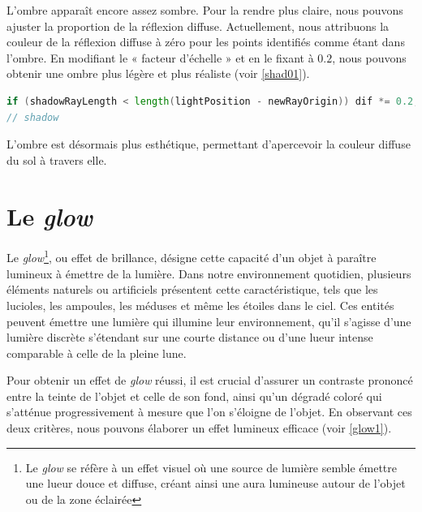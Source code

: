 L'ombre apparaît encore assez sombre. Pour la rendre plus claire, nous pouvons ajuster la proportion de la réflexion diffuse. Actuellement, nous attribuons la couleur de la réflexion diffuse à zéro pour les points identifiés comme étant dans l'ombre. En modifiant le « facteur d'échelle » et en le fixant à $0.2$, nous pouvons obtenir une ombre plus légère et plus réaliste (voir \ref{shad01}).

\begin{minipage}{\linewidth}
\begin{lstlisting}[language=GLSL, caption=Ajuster la proportion de la réflexion diffuse,captionpos=b,frame=single]
if (shadowRayLength < length(lightPosition - newRayOrigin)) dif *= 0.2; 
// shadow
\end{lstlisting}
\end{minipage}

L'ombre est désormais plus esthétique, permettant d'apercevoir la couleur diffuse du sol à travers elle.

\newpage
\section{Le \textit{glow}}

Le \textit{glow}\footnote{Le \textit{glow} se réfère à un effet visuel où une source de lumière semble émettre une lueur douce et diffuse, créant ainsi une aura lumineuse autour de l'objet ou de la zone éclairée}, ou effet de brillance, désigne cette capacité d'un objet à paraître lumineux à émettre de la lumière. Dans notre environnement quotidien, plusieurs éléments naturels ou artificiels présentent cette caractéristique, tels que les lucioles, les ampoules, les méduses et même les étoiles dans le ciel. Ces entités peuvent émettre une lumière qui illumine leur environnement, qu'il s'agisse d'une lumière discrète s'étendant sur une courte distance ou d'une lueur intense comparable à celle de la pleine lune.

Pour obtenir un effet de \textit{glow} réussi, il est crucial d'assurer un contraste prononcé entre la teinte de l'objet et celle de son fond, ainsi qu'un dégradé coloré qui s'atténue progressivement à mesure que l'on s'éloigne de l'objet. En observant ces deux critères, nous pouvons élaborer un effet lumineux efficace (voir \ref{glow1}).


